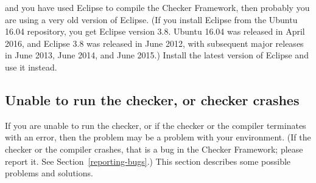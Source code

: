 \noindent
and you have used Eclipse to compile the Checker Framework, then probably
you are using a very old version of Eclipse.  (If you
install Eclipse from the Ubuntu 16.04 repository, you get Eclipse version
3.8.  Ubuntu 16.04 was released in April 2016, and Eclipse 3.8 was released
in June 2012, with subsequent major releases in June 2013, June 2014, and
June 2015.)
Install the latest version of Eclipse and use it instead.


\subsection{Unable to run the checker, or checker crashes\label{common-problems-running}}

If you are unable to run the checker, or if the checker or the compiler
terminates with an error, then the problem may be a problem with your environment.
(If the checker or the compiler crashes, that is a bug in the Checker
Framework; please report it.  See Section~\ref{reporting-bugs}.)
This section describes some possible problems and solutions.

